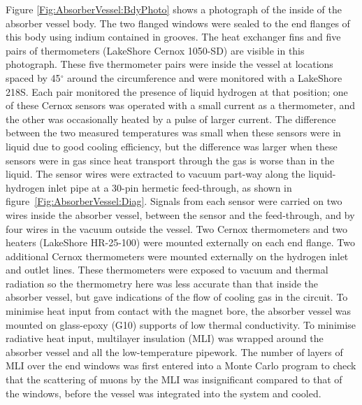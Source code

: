 Figure \ref{Fig:AbsorberVessel:BdyPhoto} shows a photograph of the inside of the
absorber vessel body.   
The two flanged windows were sealed to the end flanges of this
body using indium contained in grooves. 
The heat exchanger fins and five pairs of thermometers (LakeShore Cernox 1050-SD)
are visible in this photograph. 
These five thermometer pairs were inside the vessel at locations spaced by 45$^{\circ}$ around
the circumference and were monitored with a LakeShore 218S.
Each pair monitored the presence of liquid hydrogen at that position;
one of these Cernox sensors was operated with a small current as a
thermometer, and the other was occasionally heated by a pulse of larger current.
The difference between the two measured temperatures was small when these sensors
were in liquid due to good cooling efficiency, but the difference was
larger when these sensors were in gas since heat transport through the
gas is worse than in the liquid.
The sensor wires were extracted to vacuum part-way along the
liquid-hydrogen inlet pipe at a 30-pin hermetic feed-through, as
shown in figure~\ref{Fig:AbsorberVessel:Diag}.
Signals from each sensor were carried on two wires inside the absorber
vessel, between the sensor and the feed-through, and by four wires in
the vacuum outside the vessel.
Two Cernox thermometers and two heaters (LakeShore HR-25-100) were
mounted externally on each end flange.
Two additional Cernox
thermometers were mounted externally on the hydrogen inlet and outlet lines.
These thermometers were exposed to vacuum and thermal radiation so the thermometry
here was less accurate than that inside the absorber vessel, but gave indications
of the flow of cooling gas in the circuit. 
To minimise heat input from contact with the magnet bore, the absorber vessel was
mounted on glass-epoxy (G10) supports of low thermal conductivity.
To minimise radiative heat input, multilayer
insulation (MLI) was wrapped around the absorber vessel and all
the low-temperature pipework. 
The number of layers of MLI over the end windows was first entered
into a Monte Carlo program to check that the scattering of muons by
the MLI was insignificant compared to that of the windows, before the
vessel was integrated into the system and cooled.
